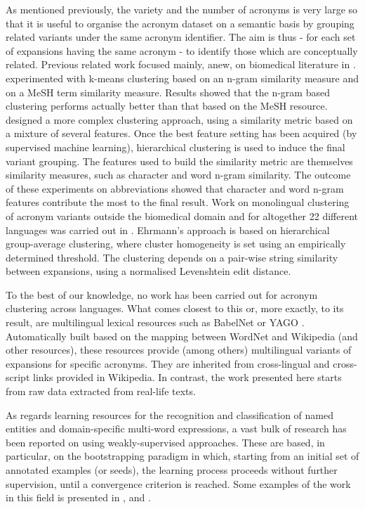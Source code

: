 \documentclass[output=paper]{langsci/langscibook}
\begin{document}
As mentioned previously, the variety and the number of acronyms is
very large so that it is useful to organise the acronym dataset on a
semantic basis by grouping related variants under the same acronym
identifier. The aim is thus - for each set of expansions having the
same acronym - to identify those which are conceptually
related. Previous related work focused mainly, anew, on biomedical
literature in . \citet{adar-04} experimented with k-means
clustering based on an n-gram similarity measure and on a MeSH term
similarity measure. Results showed that the n-gram based clustering
performs actually better than that based on the MeSH resource.
\citet{okazaki-10} designed a more complex clustering approach, using
a similarity metric based on a mixture of several features. Once the
best feature setting has been acquired (by supervised machine
learning), hierarchical clustering is used to induce the final variant
grouping. The features used to build the similarity metric are
themselves similarity measures, such as character and word n-gram
similarity.  The outcome of these experiments on  abbreviations
showed that character and word n-gram features contribute the most to
the final result. Work on monolingual clustering of acronym variants
outside the biomedical domain and for altogether 22 different
languages was carried out in \citet{ehrmann-13}. Ehrmann's approach is
based on hierarchical group-average clustering, where cluster
homogeneity is set using an empirically determined threshold.  The
clustering depends on a pair-wise string similarity between
expansions, using a normalised Levenshtein edit distance.

To the best of our knowledge, no work has been carried out for acronym
clustering across languages.  What comes closest to this or,
more exactly, to its result, are multilingual lexical resources such
as BabelNet \citep{navigli-12} or YAGO
\citep{hoffart-13}. Automatically built based on the mapping between
WordNet and Wikipedia (and other resources), these resources provide
(among others) multilingual variants of expansions for specific
acronyms.  They are inherited from cross-lingual and cross-script
links provided in Wikipedia.  In contrast, the work presented here
starts from raw data extracted from real-life texts.

As regards learning resources for the recognition and classification
of named entities and domain-specific multi-word expressions, a vast
bulk of research has been reported on using weakly-supervised
approaches. These are based, in particular, on the bootstrapping
paradigm in which, starting from an initial set of annotated examples
(or seeds), the learning process proceeds without further supervision,
until a convergence criterion is reached. Some examples of the work in
this field is presented in
\citet{riloff:aaai-1996,collins-singer:1999-emnlp}, and
\citet{yangarber:2002-coling}.
\end{document}
